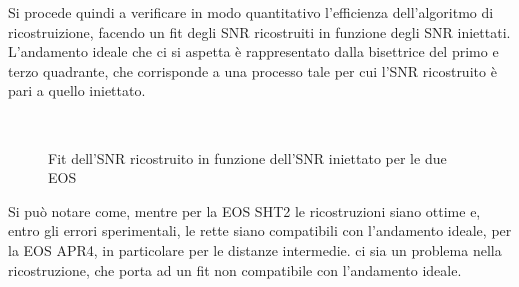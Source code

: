 Si procede quindi a verificare in modo quantitativo l'efficienza dell'algoritmo di ricostruizione, facendo un fit degli SNR ricostruiti in funzione degli SNR iniettati. L'andamento ideale che ci si aspetta è rappresentato dalla bisettrice del primo e terzo quadrante, che corrisponde a una processo tale per cui l'SNR ricostruito è pari a quello iniettato.
\begin{figure}[H]
	\vspace{-10pt}
	\centering
	 \\
	\vspace{-10pt}
	\vspace{-5pt}
	\caption{Fit dell'SNR ricostruito in funzione dell'SNR iniettato per le due EOS}
	\label{fig:overlap}
	\vspace{-15pt}
\end{figure}
Si può notare come, mentre per la EOS SHT2 le ricostruzioni siano ottime e, entro gli errori sperimentali, le rette siano compatibili con l'andamento ideale, per la EOS APR4, in particolare per le distanze intermedie. ci sia un problema nella ricostruzione, che porta ad un fit non compatibile con l'andamento ideale.

